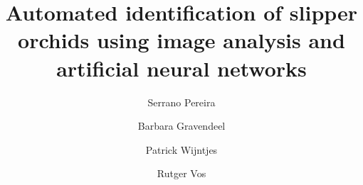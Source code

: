 \documentclass[3p,twocolumn,10pt]{elsarticle}
\begin{document}
\hypersetup{
    citecolor=DodgerBlue4,
    filecolor=DodgerBlue4,
    linkcolor=DodgerBlue4,
    urlcolor=DodgerBlue4
}

\begin{frontmatter}



\title{Automated identification of slipper orchids using image analysis and artificial neural networks}



\author[nbc]{Serrano Pereira}
\author[nbc,hsl,lu]{Barbara Gravendeel}
\author[hsl]{Patrick Wijntjes}
\author[nbc]{Rutger Vos}
\address[nbc]{Naturalis Biodiversity Center, P.O. Box 9517, Leiden, The Netherlands}
\address[hsl]{University of Applied Sciences Leiden, P.O. Box 382, Leiden, The Netherlands}
\address[lu]{Institute Biology Leiden, Leiden University, P.O. Box 546, Leiden, The Netherlands}



\end{frontmatter}
\end{document}
